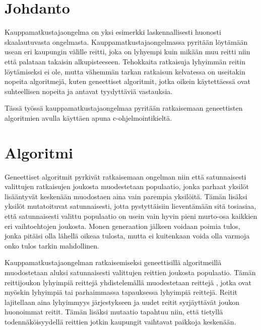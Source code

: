 \documentclass[12pt]{article}
\numberwithin{equation}{section}
\numberwithin{table}{section}
\begin{document}
\maketitle

\newpage{}



\section{Johdanto}
Kauppamatkustajaongelma on yksi esimerkki laskennallisesti huonosti skaalautuvasta ongelmasta. Kauppamatkustajaongelmassa pyritään löytämään usean eri kaupungin välille reitti, joka on lyhyempi kuin mikään muu reitti niin että palataan takaisin alkupisteeseen. Tehokkaita ratkaisuja lyhyimmän reitin löytämiseksi ei ole, mutta vähemmän tarkan ratkaisun kelvatessa on useitakin nopeita algoritmejä, kuten geneettiset algoritmit, jotka oikein käytettäessä ovat suhteellisen nopeita ja antavat tyydyttäviä vastauksia.

Tässä työssä kauppamatkustajaongelmaa pyritään ratkaisemaan geneettisten algoritmien avulla käyttäen apuna c-ohjelmointikieltä. 

\section{Algoritmi}
Geneettiset algoritmit pyrkivät ratkaisemaan ongelman niin että satunnaisesti valittujen ratkaisujen joukosta muodestetaan populaatio, jonka parhaat yksilöt lisääntyvät keskenään muodostaen aina vain parempia yksilöitä. Tämän lisäksi yksilöt mutatoituvat satunnaisesti, jotta pystyttäisiin lieventämään sitä tosiasiaa, että satunnaisesti valittu populaatio on usein vain hyvin pieni murto-osa kaikkien eri vaihtoehtojen joukosta. Monen generaation jälkeen voidaan poimia tulos, jonka pitäisi olla lähellä oikeaa tulosta, mutta ei kuitenkaan voida olla varmoja onko tulos tarkin mahdollinen.

Kauppamatkustajaongelman ratkaisemiseksi geneettisillä algoritmeillä muodostetaan aluksi satunnaisesti valittujen reittien joukosta populaatio. Tämän reittijoukon lyhyimpiä reittejä yhdistelemällä muodestetaan reittejä , jotka ovat myöskin lyhyimpiä tai parhaimmassa tapauksessa lyhyimpiä reittejä. Reitit lajitellaan aina lyhyimmyys järjestykseen ja uudet reitit syrjäyttävät joukon huonoimmat reitit. Tämän lisäksi mutaatio tapahtuu niin, että tietyllä todennäköisyydellä reittien jotkin kaupungit vaihtavat paikkoja keskenään.
\end{document}
